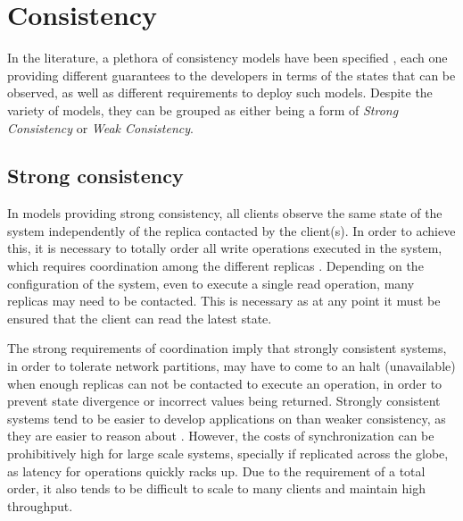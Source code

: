 \section{Consistency}


In the literature, a plethora of consistency models have been specified \cite{linearizability, si, spanner, understandingEC, cops, dynamo, cassandra}, each one providing different guarantees to the developers in terms of the states that can be observed, as well as different requirements to deploy such models.
Despite the variety of models, they can be grouped as either being a form of \emph{Strong Consistency} or \emph{Weak Consistency}.

\subsection{Strong consistency}

In models providing strong consistency, all clients observe the same state of the system independently of the replica contacted by the client(s).
In order to achieve this, it is necessary to totally order all write operations executed in the system, which requires coordination among the different replicas \cite{linearizability, spanner}.
Depending on the configuration of the system, even to execute a single read operation, many replicas may need to be contacted.
This is necessary as at any point it must be ensured that the client can read the latest state.

The strong requirements of coordination imply that strongly consistent systems, in order to tolerate network partitions, may have to come to an halt (unavailable) when enough replicas can not be contacted to execute an operation, in order to prevent state divergence or incorrect values being returned.
Strongly consistent systems tend to be easier to develop applications on than weaker consistency, as they are easier to reason about \cite{spanner}.
However, the costs of synchronization can be prohibitively high for large scale systems, specially if replicated across the globe, as latency for operations quickly racks up.
Due to the requirement of a total order, it also tends to be difficult to scale to many clients and maintain high throughput.

